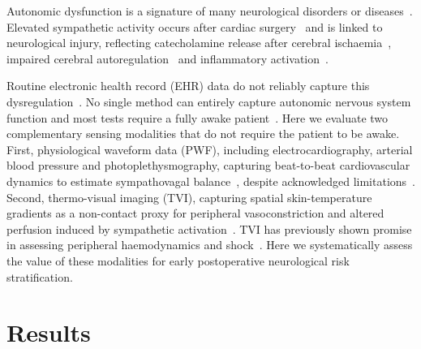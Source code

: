 \documentclass[11pt]{article}
\begin{document}
Autonomic dysfunction is a signature of many neurological disorders or diseases~\citep{wehrwein2016overview}. Elevated sympathetic activity occurs after cardiac surgery~\citep{hogue1994alterations, bauernschmitt2004impairment} and is linked to neurological injury, reflecting catecholamine release after cerebral ischaemia~\citep{jimenez2021cardiovascular, sposato2020post, de2015autonomic}, impaired cerebral autoregulation~\citep{chen2021autonomic, mankoo2023role, aaslid1989cerebral, lee2019dysfunctional, schramm2012impaired, longhitano2021cerebral} and inflammatory activation~\citep{mattimore2023delirium, staicu2025postoperative, hansen2025prediction, pongratz2014sympathetic, poredos2025inflammation}.

Routine electronic health record (EHR) data do not reliably capture this dysregulation~\citep{zygmunt2010methods, seravalle2013assess}. No single method can entirely capture autonomic nervous system function and most tests require a fully awake patient~\citep{zygmunt2010methods}. Here we evaluate two complementary sensing modalities that do not require the patient to be awake. First, physiological waveform data (PWF), including electrocardiography, arterial blood pressure and photoplethysmography, capturing beat-to-beat cardiovascular dynamics to estimate sympathovagal balance~\citep{colombo2015pulse, valenza2018ecg, budidha2019photoplethysmography}, despite acknowledged limitations~\citep{zygmunt2010methods, ackermann2021commentary}. Second, thermo-visual imaging (TVI), capturing spatial skin-temperature gradients as a non-contact proxy for peripheral vasoconstriction and altered perfusion induced by sympathetic activation~\citep{guyenet2006sympathetic, sheng2018crosstalk}. TVI has previously shown promise in assessing peripheral haemodynamics and shock~\citep{jorge_non-contact_2021, predicting_shock_from_thermal_images, podlasek2025thermography}.
Here we systematically assess the value of these modalities for early postoperative neurological risk stratification.

\section*{Results}
\end{document}
